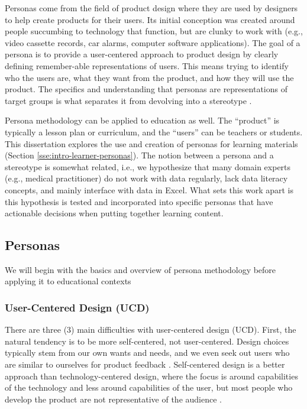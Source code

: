 \documentclass[010-intro.tex]{subfiles}
\begin{document}
Personas come from the field of product design
where they are used by designers to help create products for their users.
Its initial conception was created around people succumbing to technology that
function, but are clunky to work with
(e.g., video cassette records, car alarms, computer software applications).
The goal of a persona is to provide a user-centered approach to product design
by clearly defining remember-able representations of users.
This means trying to identify who the users are,
what they want from the product, and
how they will use the product.
The specifics and understanding that personas are representations of target groups
is what separates it from devolving into a stereotype
\cite{pruittPersonaLifecycleKeeping2006}.

Persona methodology can be applied to education as well.
The ``product'' is typically a lesson plan or curriculum,
and the ``users'' can be teachers
\cite{zagallo2019through}
or students.
This dissertation explores the use and creation of personas for learning materials
(Section \ref{sse:intro-learner-personas}).
The notion between a persona and a stereotype is somewhat related,
i.e., we hypothesize that many domain experts (e.g., medical practitioner)
do not work with data regularly,
lack data literacy concepts,
and mainly interface with data in Excel.
What sets this work apart is this hypothesis is tested and incorporated into specific
personas that have actionable decisions when putting together learning content.

\subsection{Personas}

We will begin with the basics and overview of persona methodology
before applying it to educational contexts

    \subsubsection{User-Centered Design (UCD)}
    
        There are three (3) main difficulties with user-centered design (UCD).
        First,
        the natural tendency is to be more self-centered, not user-centered.
            Design choices typically stem from our own wants and needs,
            and we even seek out users who are similar to ourselves for product feedback
            \cite{pruittPersonaLifecycleKeeping2006, tognazziniTogSoftwareDesign1748}.
            Self-centered design is a better approach than technology-centered design,
            where the focus is around capabilities of the technology and less around capabilities of the user,
            but most people who develop the product are not representative of the audience
            \cite{pruittPersonaLifecycleKeeping2006}.
    
\end{document}
